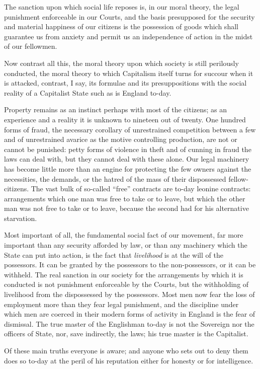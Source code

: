 \documentclass{book}
\begin{document}
The sanction upon which social life reposes is, in our moral theory, the legal punishment enforceable in our Courts, and the basis presupposed for the security and material happiness of our citizens is the possession of goods which shall guarantee us from anxiety and permit us an independence of action in the midst of our fellowmen.

Now contrast all this, the moral theory upon which society is still perilously conducted, the moral theory to which Capitalism itself turns for succour when it is attacked, contrast, I say, its formulae and its presuppositions with the social reality of a Capitalist State such as is England to-day.

Property remains as an instinct perhaps with most of the citizens; as an experience and a reality it is unknown to nineteen out of twenty. One hundred forms of fraud, the necessary corollary of unrestrained competition between a few and of unrestrained avarice as the motive controlling production, are not or cannot be punished: petty forms of violence in theft and of cunning in fraud the laws can deal with, but they cannot deal with these alone. Our legal machinery has become little more than an engine for protecting the few owners against the necessities, the demands, or the hatred of the mass of their dispossessed fellow-citizens. The vast bulk of so-called “free” contracts are to-day leonine contracts: arrangements which one man was free to take or to leave, but which the other man was not free to take or to leave, because the second had for his alternative starvation.

Most important of all, the fundamental social fact of our movement, far more important than any security afforded by law, or than any machinery which the State can put into action, is the fact that \emph{livelihood} is at the will of the possessors. It can be granted by the possessors to the non-possessors, or it can be withheld. The real sanction in our society for the arrangements by which it is conducted is not punishment enforceable by the Courts, but the withholding of livelihood from the dispossessed by the possessors. Most men now fear the loss of employment more than they fear legal punishment, and the discipline under which men are coerced in their modern forms of activity in England is the fear of dismissal. The true master of the Englishman to-day is not the Sovereign nor the officers of State, nor, save indirectly, the laws; his true master is the Capitalist.

Of these main truths everyone is aware; and anyone who sets out to deny them does so to-day at the peril of his reputation either for honesty or for intelligence.
\end{document}
